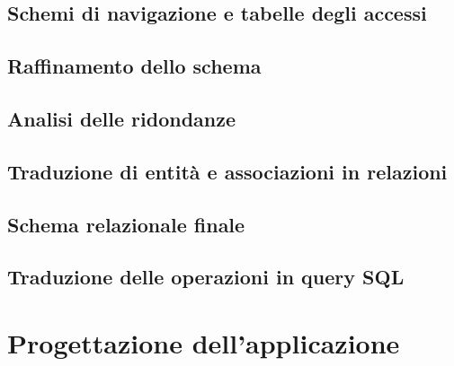 \documentclass[a4paper,12pt]{report}
\begin{document}
\section{Schemi di navigazione e tabelle degli accessi}

\section{Raffinamento dello schema}
\section{Analisi delle ridondanze}
\section{Traduzione di entità e associazioni in relazioni}


\section{Schema relazionale finale}
\newpage
\section{Traduzione delle operazioni in query SQL}

\newpage
\chapter{Progettazione dell'applicazione}
\end{document}
